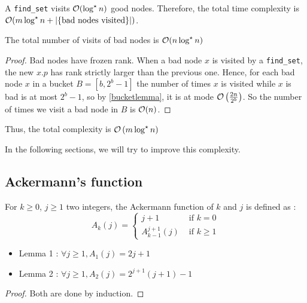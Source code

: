 \documentclass[12pt]{cours}
\begin{document}
A \texttt{find\_set} visits $\mathcal{O}(\log^{\star} n)$ good nodes. Therefore, the total time complexity is $\mathcal{O}(m\log^{\star} n + \left|\left\{\text{bad nodes visited}\right\}\right|)$.

\begin{proposition}
    The total number of visits of bad nodes is $\mathcal{O}(n\log^{\star} n)$
\end{proposition}
\begin{proof}
    Bad nodes have frozen rank. When a bad node $x$ is visited by a \texttt{find\_set}, the new $x.p$ has rank strictly larger than the previous one. Hence, for each bad node $x$ in a bucket $B = \left[b, 2^{b}-1\right]$ the number of times $x$ is visited while $x$ is bad is at most $2^{b} - 1$, so by \ref{bucketlemma}, it is at mode $\mathcal{O}\left(\frac{2n}{2^{b}}\right)$. So the number of times we visit a bad node in $B$ is $\mathcal{O}(n)$.
\end{proof}

Thus, the total complexity is $\mathcal{O}\left(m \log^{\star} n\right)$

In the following sections, we will try to improve this complexity.
\subsection{Ackermann's function}
\begin{definition}
    For $k \geq 0$, $j \geq 1$ two integers, the Ackermann function of $k$ and $j$ is defined as :
    \[
        A_{k}(j) = \begin{cases}
            j + 1                & \text{ if } k = 0    \\
            A_{k - 1}^{j + 1}(j) & \text{ if } k \geq 1
        \end{cases}
    \]
\end{definition}

\begin{proposition}[Properties]
    \begin{itemize}
        \item Lemma 1 : $\forall j \geq 1, A_{1}(j) = 2j + 1$
        \item Lemma 2 : $\forall j \geq 1, A_{2}(j) = 2^{j + 1}(j + 1) - 1$
    \end{itemize}
\end{proposition}
\begin{proof}
    Both are done by induction.
\end{proof}
\end{document}

